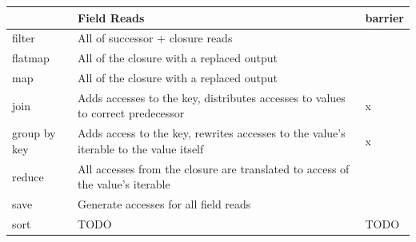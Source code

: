 \begin{table}
    \begin{tabular}{l|l|l}
    
        ~            & Field Reads                                                                           & barrier \\ \hline
        filter       & All of successor + closure reads                                                      & ~       \\ 
        flatmap      & All of the closure with a replaced output                                             & ~       \\ 
        map          & All of the closure with a replaced output                                             & ~       \\ 
        join         & Adds accesses to the key, distributes accesses to values to correct predecessor       & x       \\ 
        group by key & Adds access to the key, rewrites accesses to the value's iterable to the value itself & x       \\ 
        reduce       & All accesses from the closure are translated to access of the value's iterable        & ~       \\ 
        save         & Generate accesses for all field reads                                                 & ~       \\ 
        sort         & TODO                                                                                  & TODO    \\ 


    \end{tabular}
    \label{table:field_reduction}
\end{table}

